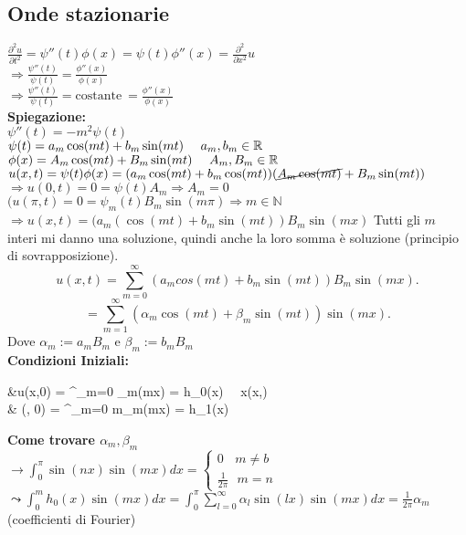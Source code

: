 \documentclass[12px]{article}
\begin{document}
	\subsection{Onde stazionarie}
	$\frac {\partial ^2 u}{\partial t^2} = \psi''(t)\phi(x) = \psi(t)\phi''(x) = \frac {\partial^2}{\partial x^2}u$\\
	$ \Rightarrow \frac {\psi''(t)}{\psi(t)} = \frac{\phi''(x)}{\phi(x)}$ \\
	$ \Rightarrow \frac {\psi''(t)}{\psi (t)} = \text {costante} \ = \frac{\phi''(x)}{\phi(x)}$\\[10px]
	\textbf{Spiegazione:}\\
	$\psi''(t) = -m^2\psi(t)$\\
	$\psi(t) = a_m\cos(mt) + b_m\sin(mt) \ \ \ \ a_m,b_m\in \R$\\
	$\phi(x) = A_m\cos(mt) + B_m\sin(mt) \ \ \ \ A_m,B_m\in \R$\\[20px]
	$u(x,t) = \psi(t)\phi(x) = (a_m \cos(mt) + b_m\cos(mt)) (\cancel{A_m\cos(mt)} + B_m\sin(mt))$\\
	$ \Rightarrow u(0,t) = 0 = \psi(t)A_m \Rightarrow A_m = 0$ \\
	$(u(\pi,t) = 0 = \psi_m(t)B_m\sin(m\pi) \Rightarrow  m\in \mathbb N$ \\
	$ \Rightarrow u(x,t) = (a_m(\cos(mt) + b_m\sin(mt))B_m\sin(mx)$
	Tutti gli $m$ interi mi danno una soluzione, quindi anche la loro somma è soluzione (principio di sovrapposizione).
	\[
	u(x,t) = \sum_{m=0}^\infty (a_mcos(mt) + b_m\sin(mt))B_m\sin(mx)
	.\] 
	\[
	=\sum^\infty_{m=1} (\alpha_m\cos(mt) + \beta_m\sin(mt))\sin(mx)
	.\] 
	Dove $\alpha_m:=a_mB_m $ e  $\beta_m:=b_mB_m$\\
	 \textbf{Condizioni Iniziali:}\\
	 \begin{aligend}
	 &\displaystyle u(x,0) = \sum^\infty_{m=0} \alpha_m\sin(mx) = h_0(x) \ \ \foral x\in (x,\pi)\\
	 & (\alpha, 0) = \sum^\infty_{m=0} m\beta_m\sin(mx) = h_1(x)
	 	
	 \end{aligend}
	 \textbf{Come trovare $\alpha_m, \beta_m$ }\\
	 $ \displaystyle \rightarrow\int_0^\pi\sin(nx)\sin(mx)dx = \begin{cases}
	 	0 \ \ \ \ m\neq b\\
		\frac{1} {2\pi} \ \ \ m = n
	 \end{cases}$\\
	 $\displaystyle\leadsto \int^m_0 h_0(x)\sin(mx)dx = \int_0^\pi \sum^\infty_{l=0}\alpha_l\sin(lx)\sin(mx)dx = \frac {1}{2\pi} \alpha_m$ (coefficienti di Fourier)\\
\end{document}
